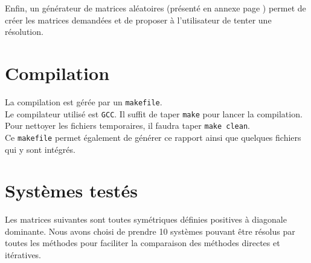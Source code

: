 \documentclass{report}
\begin{document}
  \vspace{0.3cm}
  Enfin, un générateur de matrices aléatoires (présenté en annexe page \pageref{generateur}) permet de créer les matrices demandées et de proposer à l'utilisateur de tenter une résolution.

	\section{Compilation}
    La compilation est gérée par un \verb"makefile".\\
    Le compilateur utilisé est \verb"GCC".
    Il suffit de taper \verb"make" pour lancer la compilation.\\
    Pour nettoyer les fichiers temporaires, il faudra taper \verb"make clean".\\
    Ce \verb"makefile" permet également de générer ce rapport ainsi que quelques fichiers qui y sont intégrés.

	\newpage
	\section{Systèmes testés}
	  Les matrices suivantes sont toutes symétriques définies positives à diagonale dominante. Nous avons choisi de prendre 10 systèmes pouvant être résolus par toutes les méthodes pour faciliter la comparaison des méthodes directes et itératives.
	  \vspace{0.5cm}
	  
\end{document}

